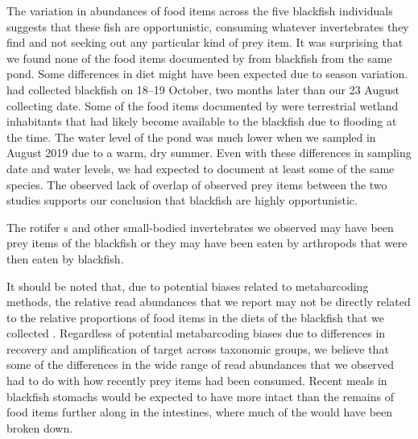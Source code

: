 \begin{multicols}{2}
The variation in abundances of food items across the five blackfish individuals suggests that these fish are opportunistic, consuming whatever invertebrates they find and not seeking out any particular kind of prey item. It was surprising that we found none of the food items documented by \citet{Bowseretal2019} from blackfish from the same pond. Some differences in diet might have been expected due to season variation. \citet{Bowseretal2019} had collected blackfish on 18--19 October, two months later than our 23 August collecting date. Some of the food items documented by \citet{Bowseretal2019} were terrestrial wetland inhabitants that had likely become available to the blackfish due to flooding at the time. The water level of the pond was much lower when we sampled in August 2019 due to a warm, dry summer. Even with these differences in sampling date and water levels, we had expected to document at least some of the same species. The observed lack of overlap of observed prey items between the two studies supports our conclusion that blackfish are highly opportunistic.   


The rotifer s and other small-bodied invertebrates we observed may have been prey items of the blackfish or they may have been eaten by arthropods that were then eaten by blackfish. 

It should be noted that, due to potential biases related to metabarcoding methods, the relative read abundances that we report may not be directly related to the relative proportions of food items in the diets of the blackfish that we collected \citep[see][for an overview]{Deagleetal2018}. Regardless of potential metabarcoding biases due to differences in recovery and amplification of target  across taxonomic groups, we believe that some of the differences in the wide range of read abundances that we observed had to do with how recently prey items had been consumed. Recent meals in blackfish stomachs would be expected to have more intact  than the remains of food items further along in the intestines, where much of the  would have been broken down.


\end{multicols}
